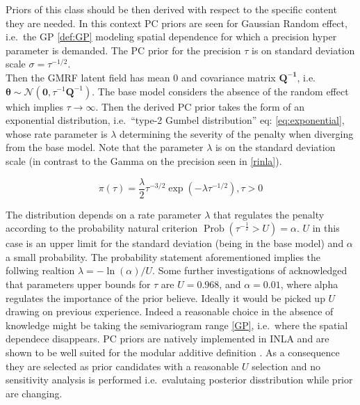 \documentclass[
  12pt,
  a4paper,
  oneside]{book}
\theoremstyle{definition}
\theoremstyle{definition}
\theoremstyle{definition}
\theoremstyle{remark}
\begin{document}
Priors of this class should be then derived with respect to the specific content they are needed. In this context PC priors are seen for Gaussian Random effect, i.e.~the GP \ref{def:GP} modeling spatial dependence for which a precision hyper parameter is demanded. The PC prior for the precision \(\tau\) is on standard deviation scale \(\sigma=\tau^{-1 / 2}\).\\
Then the GMRF latent field has mean 0 and covariance matrix \(\boldsymbol{Q^{-1}}\), i.e.~\(\boldsymbol{\theta} \sim \mathcal{N}\left(\mathbf{0}, \tau^{-1} \boldsymbol{Q}^{-1}\right)\). The base model considers the absence of the random effect which implies \(\tau \rightarrow \infty\). Then the derived PC prior \citep{simpson2017} takes the form of an exponential distribution, i.e.~``type-2 Gumbel distribution'' eq: \eqref{eq:exponential}, whose rate parameter is \(\lambda\) determining the severity of the penalty when diverging from the base model. Note that the parameter \(\lambda\) is on the standard deviation scale (in contrast to the Gamma on the precision seen in \ref{rinla}).

\begin{equation}
  \pi(\tau)=\frac{\lambda}{2} \tau^{-3 / 2} \exp \left(-\lambda \tau^{-1 / 2}\right), \tau>0
\label{eq:exponential}
\end{equation}

The distribution depends on a rate parameter \(\lambda\) that regulates the penalty according to the probability natural criterion \citep{slides} \(\operatorname{Prob}(\tau^{-\frac{1}{2}} > U)=\alpha\). \(U\) in this case is an upper limit for the standard deviation (being in the base model) and \(\alpha\) a small probability. The probability statement aforementioned implies the follwing realtion \(\lambda=-\ln (\alpha) / U\). Some further investigations of \citet{simpson2017} acknowledged that parameters upper bounds for \(\tau\) are \(U = 0.968\), and \(\alpha = 0.01\), where alpha regulates the importance of the prior believe. Ideally it would be picked up \(U\) drawing on previous experience. Indeed a reasonable choice in the absence of knowledge might be taking the semivariogram range \ref{GP}, i.e.~where the spatial dependece disappears.
PC priors are natively implemented in INLA and are shown to be well suited for the modular additive definition \citep{Bayesian_INLA_Rubio}. As a consequence they are selected as prior candidates with a reasonable \(U\) selection and no sensitivity analysis is performed i.e.~evalutaing posterior disstribution while prior are changing.
\end{document}
